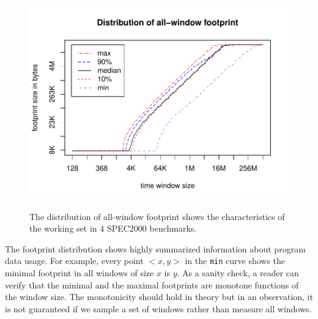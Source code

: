 \begin{figure}[!h]
{    \includegraphics[width=\figwid]{figures/fp/183_equake_ref}
    \label{fp-equake-128}
  }\hfill {}\hfill
  \caption{The distribution of all-window footprint shows the
    characteristics of the working set in 4 SPEC2000 benchmarks.}
  \label{fig:all-fp-group}
\end{figure}

The footprint distribution shows highly summarized information about
program data usage.  For example, every point $<x,y>$ in the {\tt min} curve
shows the minimal footprint in all windows of size $x$ is $y$.  
As a sanity check, a reader can verify that the minimal and the
maximal footprints are monotone functions of the window size.  The
monotonicity should hold in theory but in an observation, it is not
guaranteed if we sample a set of windows rather than measure all
windows.


